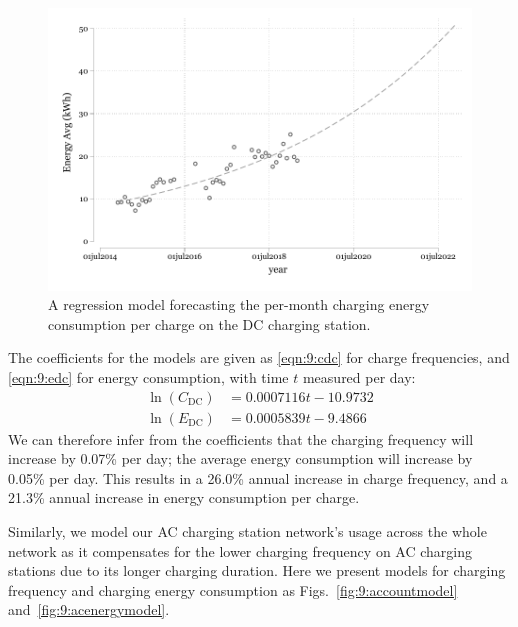 \begin{figure}[H]
	\centering
	\includegraphics[width=0.9\linewidth]{DC_6_1}
	\caption[DC energy consumption regression model]{A regression model forecasting the per-month charging energy consumption per charge on the DC charging station.}
	\label{fig:9:dcenergymodel}
\end{figure}

The coefficients for the models are given as \eqref{eqn:9:cdc} for charge frequencies, and \eqref{eqn:9:edc} for energy consumption, with time $t$ measured per day:
\begin{align}
\ln(C_\mathrm{DC}) &= 0.0007116t - 10.9732 
\label{eqn:9:cdc} \\
\ln(E_\mathrm{DC}) &= 0.0005839t - 9.4866
\label{eqn:9:edc}
\end{align}
We can therefore infer from the coefficients that the charging frequency will increase by 0.07\% per day; the average energy consumption will increase by 0.05\% per day. This results in a 26.0\% annual increase in charge frequency, and a 21.3\% annual increase in energy consumption per charge. 

Similarly, we model our AC charging station network’s usage across the whole network as it compensates for the lower charging frequency on AC charging stations due to its longer charging duration. Here we present models for charging frequency and charging energy consumption as Figs.~\ref{fig:9:accountmodel} and~\ref{fig:9:acenergymodel}.

